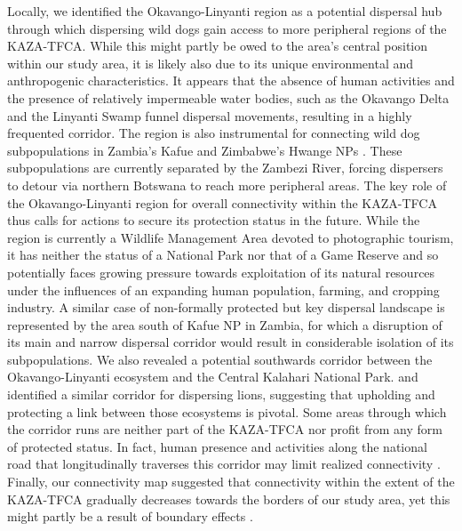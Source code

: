 \documentclass[abstract=on,10pt,a4paper,bibliography=totocnumbered]{article}
\begin{document}
Locally, we identified the Okavango-Linyanti region as a potential dispersal hub
through which dispersing wild dogs gain access to more peripheral regions of the
KAZA-TFCA. While this might partly be owed to the area's central position within
our study area, it is likely also due to its unique environmental and
anthropogenic characteristics. It appears that the absence of human activities
and the presence of relatively impermeable water bodies, such as the Okavango
Delta and the Linyanti Swamp funnel dispersal movements, resulting in a highly
frequented corridor. The region is also instrumental for connecting wild dog
subpopulations in Zambia's Kafue and Zimbabwe's Hwange NPs
\citep{Woodroffe.2012}. These subpopulations are currently separated by the
Zambezi River, forcing dispersers to detour via northern Botswana to reach more
peripheral areas. The key role of the Okavango-Linyanti region for overall
connectivity within the KAZA-TFCA thus calls for actions to secure its
protection status in the future. While the region is currently a Wildlife
Management Area devoted to photographic tourism, it has neither the status of a
National Park nor that of a Game Reserve and so potentially faces growing
pressure towards exploitation of its natural resources under the influences of
an expanding human population, farming, and cropping industry. A similar case of
non-formally protected but key dispersal landscape is represented by the area
south of Kafue NP in Zambia, for which a disruption of its main and narrow
dispersal corridor would result in considerable isolation of its subpopulations.
We also revealed a potential southwards corridor between the Okavango-Linyanti
ecosystem and the Central Kalahari National Park. \cite{Elliot.2014} and
\citep{Cushman.2018} identified a similar corridor for dispersing lions,
suggesting that upholding and protecting a link between those ecosystems is
pivotal. Some areas through which the corridor runs are neither part of the
KAZA-TFCA nor profit from any form of protected status. In fact, human presence
and activities along the national road that longitudinally traverses this
corridor may limit realized connectivity \citep{Cozzi.2020}. Finally, our
connectivity map suggested that connectivity within the extent of the KAZA-TFCA
gradually decreases towards the borders of our study area, yet this might partly
be a result of boundary effects \citep{Koen.2010}.
\end{document}

